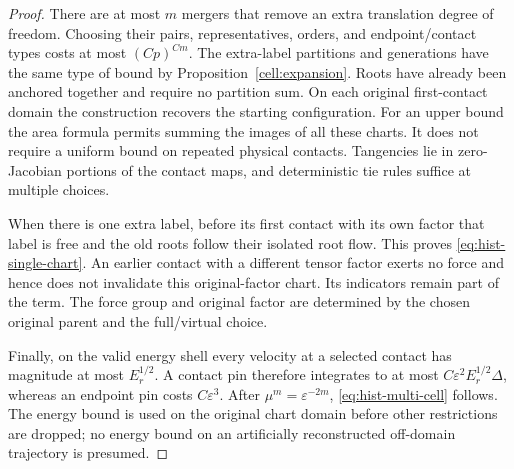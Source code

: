 \begin{proof}
There are at most $m$ mergers that remove an extra translation degree
of freedom.  Choosing their pairs, representatives, orders, and
endpoint/contact types costs at most $(Cp)^{Cm}$.  The extra-label
partitions and generations have the same type of bound by
Proposition~\ref{cell:expansion}.  Roots have already been anchored
together and require no partition sum.  On each original first-contact
domain the construction recovers the starting configuration.  For an
upper bound the area formula permits summing the images of all these
charts.  It does not require a uniform bound on repeated physical
contacts.  Tangencies lie in zero-Jacobian portions of the contact
maps, and deterministic tie rules suffice at multiple choices.

When there is one extra label, before its first contact with its own
factor that label is free and the old roots follow their isolated
root flow.  This proves \eqref{eq:hist-single-chart}.  An earlier
contact with a different tensor factor exerts no force and hence does
not invalidate this original-factor chart.  Its indicators remain
part of the term.  The force group and original factor are determined
by the chosen original parent and the full/virtual choice.

Finally, on the valid energy shell every velocity at a selected contact
has magnitude at most $E_r^{1/2}$.  A contact pin therefore integrates
to at most $C\varepsilon^2 E_r^{1/2}\Delta$, whereas an endpoint pin
costs $C\varepsilon^3$.  After $\mu^m=\varepsilon^{-2m}$,
\eqref{eq:hist-multi-cell} follows.  The energy bound is used on the
original chart domain before other restrictions are dropped; no
energy bound on an artificially reconstructed off-domain trajectory
is presumed.
\end{proof}


